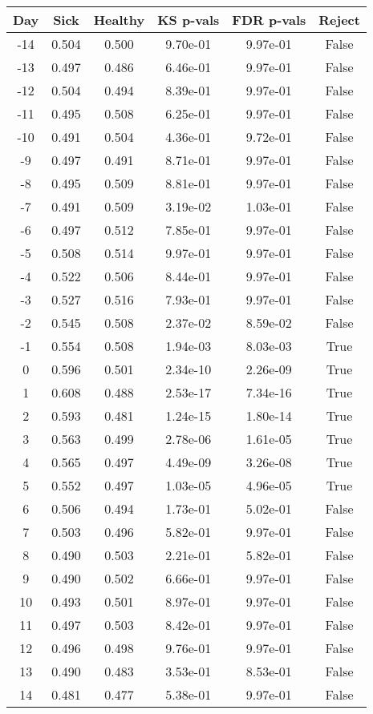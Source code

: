 \begin{tabular}{c|c|c|c|c|c}
Day &  Sick & Healthy &  KS p-vals & FDR p-vals & Reject\\
\hline
-14 & 0.504 &   0.500 &   9.70e-01 &   9.97e-01 &  False\\
-13 & 0.497 &   0.486 &   6.46e-01 &   9.97e-01 &  False\\
-12 & 0.504 &   0.494 &   8.39e-01 &   9.97e-01 &  False\\
-11 & 0.495 &   0.508 &   6.25e-01 &   9.97e-01 &  False\\
-10 & 0.491 &   0.504 &   4.36e-01 &   9.72e-01 &  False\\
 -9 & 0.497 &   0.491 &   8.71e-01 &   9.97e-01 &  False\\
 -8 & 0.495 &   0.509 &   8.81e-01 &   9.97e-01 &  False\\
 -7 & 0.491 &   0.509 &   3.19e-02 &   1.03e-01 &  False\\
 -6 & 0.497 &   0.512 &   7.85e-01 &   9.97e-01 &  False\\
 -5 & 0.508 &   0.514 &   9.97e-01 &   9.97e-01 &  False\\
 -4 & 0.522 &   0.506 &   8.44e-01 &   9.97e-01 &  False\\
 -3 & 0.527 &   0.516 &   7.93e-01 &   9.97e-01 &  False\\
 -2 & 0.545 &   0.508 &   2.37e-02 &   8.59e-02 &  False\\
 -1 & 0.554 &   0.508 &   1.94e-03 &   8.03e-03 &   True\\
  0 & 0.596 &   0.501 &   2.34e-10 &   2.26e-09 &   True\\
  1 & 0.608 &   0.488 &   2.53e-17 &   7.34e-16 &   True\\
  2 & 0.593 &   0.481 &   1.24e-15 &   1.80e-14 &   True\\
  3 & 0.563 &   0.499 &   2.78e-06 &   1.61e-05 &   True\\
  4 & 0.565 &   0.497 &   4.49e-09 &   3.26e-08 &   True\\
  5 & 0.552 &   0.497 &   1.03e-05 &   4.96e-05 &   True\\
  6 & 0.506 &   0.494 &   1.73e-01 &   5.02e-01 &  False\\
  7 & 0.503 &   0.496 &   5.82e-01 &   9.97e-01 &  False\\
  8 & 0.490 &   0.503 &   2.21e-01 &   5.82e-01 &  False\\
  9 & 0.490 &   0.502 &   6.66e-01 &   9.97e-01 &  False\\
 10 & 0.493 &   0.501 &   8.97e-01 &   9.97e-01 &  False\\
 11 & 0.497 &   0.503 &   8.42e-01 &   9.97e-01 &  False\\
 12 & 0.496 &   0.498 &   9.76e-01 &   9.97e-01 &  False\\
 13 & 0.490 &   0.483 &   3.53e-01 &   8.53e-01 &  False\\
 14 & 0.481 &   0.477 &   5.38e-01 &   9.97e-01 &  False\\
\end{tabular}